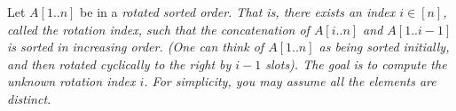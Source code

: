 \documentclass[10pt]{article}
\begin{document}





Let \( A[1..n] \) be in a \it{rotated} sorted order. That is, there exists an index \( i \in [n] \), called the \it{rotation index}, such that the concatenation of \( A[i..n] \) and \( A[1..i - 1] \) is sorted in increasing order. (One can think of \( A[1..n] \) as being sorted initially, and then rotated cyclically to the right by \( i - 1 \) slots). The goal is to compute the unknown rotation index \( i \). For simplicity, you may assume all the elements are distinct.
\end{document}
